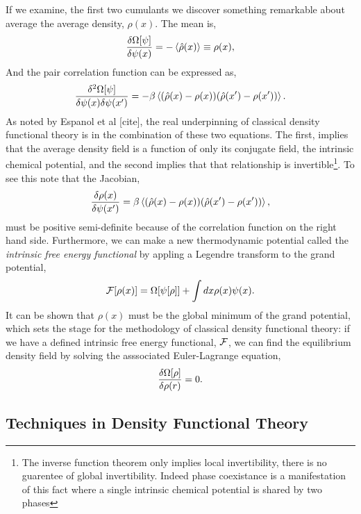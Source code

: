 If we examine, the first two cumulants we discover something remarkable about average the average density, $\rho(x)$. The mean is,
\begin{equation}
    \frac{\delta \Omega[\psi]}{\delta \psi(x)} = -\left\langle \hat{\rho}(x) \right\rangle \equiv \rho(x),
\end{equation}
And the pair correlation function can be expressed as, 
\begin{equation}
    \frac{\delta^2 \Omega[\psi]}{\delta \psi(x) \delta \psi(x^\prime)} = - \beta \left\langle (\hat{\rho}(x) - \rho(x))(\hat{\rho}(x^\prime) - \rho(x^\prime)) \right\rangle.
\end{equation}
As noted by Espanol et al [cite], the real underpinning of classical density functional theory is in the combination of these two equations.
The first, implies that the average density field is a function of only its conjugate field, the intrinsic chemical potential, and the second implies that that relationship is invertible\footnote{The inverse function theorem only implies local invertibility, there is no guarentee of global invertibility. Indeed phase coexistance is a manifestation of this fact where a single intrinsic chemical potential is shared by two phases}.
To see this note that the Jacobian, 
\begin{equation}
    \frac{\delta \rho(x)}{\delta \psi(x^\prime)} = \beta \left\langle  (\hat{\rho}(x) - \rho(x))(\hat{\rho}(x^\prime) - \rho(x^\prime)) \right\rangle, 
\end{equation}
must be positive semi-definite because of the correlation function on the right hand side. Furthermore, we can make a new thermodynamic potential called the \textit{intrinsic free energy functional} by appling a Legendre transform to the grand potential,
\begin{equation}
    \mathcal{F}[\rho(x)] = \Omega[\psi[\rho]] + \int dx \rho(x) \psi(x).
\end{equation}
It can be shown \cite{HansenAppendixB} that $\rho(x)$ must be the global minimum of the grand potential, which sets the stage for the methodology of classical density functional theory: if we have a defined intrinsic free energy functional, $\mathcal{F}$, we can find the equilibrium density field by solving the asssociated Euler-Lagrange equation, 
\begin{equation}
    \frac{\delta \Omega[\rho]}{\delta \rho(r)} = 0.
\end{equation}

\subsection{Techniques in Density Functional Theory}

